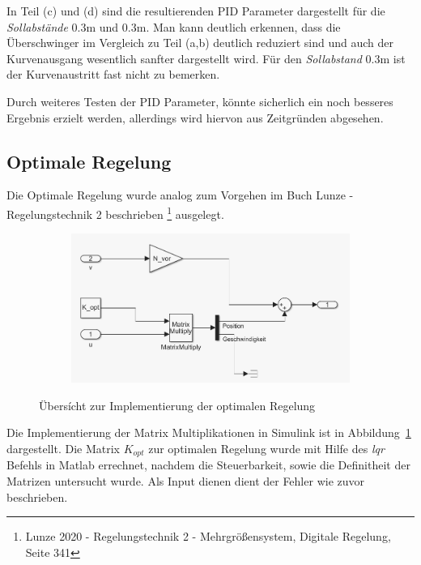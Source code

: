 In Teil (c) und (d) sind die resultierenden PID Parameter dargestellt für die
\textit{Sollabstände} $0.3\mathrm{m}$ und $0.3\mathrm{m}$. Man kann deutlich
erkennen, dass die Überschwinger im Vergleich zu Teil (a,b) deutlich reduziert
sind und auch der Kurvenausgang wesentlich sanfter dargestellt wird. Für den
\textit{Sollabstand} $0.3 \mathrm{m}$ ist der Kurvenaustritt fast nicht zu
bemerken.

Durch weiteres Testen der PID Parameter, könnte sicherlich ein noch besseres
Ergebnis erzielt werden, allerdings wird hiervon aus Zeitgründen abgesehen.
\subsection{Optimale Regelung}\label{subsec:optimale_regelung}
Die Optimale Regelung wurde analog zum Vorgehen im Buch Lunze - Regelungstechnik
2 beschrieben \footnote{Lunze 2020 - Regelungstechnik 2 - Mehrgrößensystem,
Digitale Regelung, Seite 341} ausgelegt.
\begin{figure}[hbt]
\centering
\begin{subfigure}{0.49\textwidth}
    \centering
    \includegraphics*[width=\textwidth]{figures/opt_reg.png}
\end{subfigure}
    \caption{Übersícht zur Implementierung der optimalen Regelung
    \label{fig:optreg}}
\end{figure}    
Die Implementierung der Matrix Multiplikationen in Simulink ist in
Abbildung~\ref{fig:optreg} dargestellt. Die Matrix $K_{opt}$ zur optimalen Regelung
wurde mit Hilfe des \textit{lqr} Befehls in Matlab errechnet, nachdem die
Steuerbarkeit, sowie die Definitheit der Matrizen untersucht wurde. Als Input
dienen dient der Fehler wie zuvor beschrieben.

